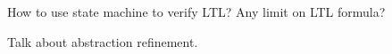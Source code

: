 {\color{blue} How to use state machine to verify LTL?}
{\color{blue} Any limit on LTL formula?}

{\color{blue} Talk about abstraction refinement.}








\begin{comment}
Thus, we add constraints that quadrotor is located in region $R_j$ currently and moves to region $R_{j^\prime}$,
$\forall j \neq j^\prime \in {1, ..., M}$:
\begin{equation}
    \label{eq:region}
    E_j[x_{p_t} \quad y_{p_t}]^\intercal <= f_j, \qquad E_{j^\prime}[x_{p_{t+1}} \quad y_{p_{t+1}}]^\intercal <= f_{j^\prime}
\end{equation}
\end{comment}




